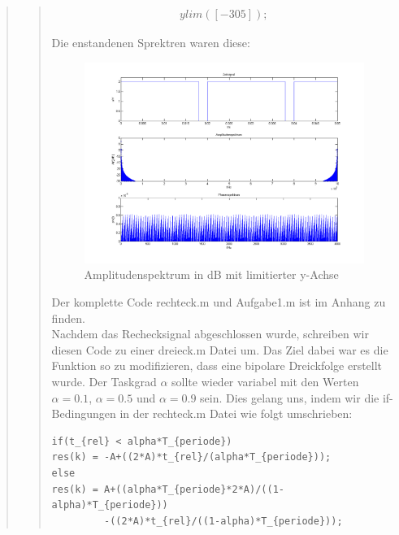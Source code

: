 \begin{quote}
\begin{quote}
\begin{center}
		\begin{align*}
    		ylim ([-30 5]);
		\end{align*}
		
		\end{center}

		Die enstandenen Sprektren waren diese:
		
	           \begin{figure}[H]
    			\centering
    				\includegraphics[scale=0.5]{Ampl[dB].png}
    			\caption{Amplitudenspektrum in dB mit limitierter y-Achse}
    			\end{figure}		
		
		
		\vspace{1em}
		
		Der komplette Code rechteck.m und Aufgabe1.m ist im Anhang zu finden.\\
		
		
		Nachdem das Rechecksignal abgeschlossen wurde, schreiben wir diesen Code zu
		einer dreieck.m Datei um. Das Ziel dabei war es die Funktion so zu
		modifizieren, dass eine bipolare Dreickfolge erstellt wurde. Der Taskgrad
		$\alpha$ sollte wieder variabel mit den Werten $\alpha = 0.1$, $\alpha = 0.5$
		und $\alpha = 0.9$ sein. Dies gelang uns, indem wir die if-Bedingungen in der
		rechteck.m Datei wie folgt umschrieben:

\begin{lstlisting}
if(t_{rel} < alpha*T_{periode})
res(k) = -A+((2*A)*t_{rel}/(alpha*T_{periode}));
else
res(k) = A+((alpha*T_{periode}*2*A)/((1-alpha)*T_{periode}))
         -((2*A)*t_{rel}/((1-alpha)*T_{periode}));
\end{lstlisting}  
		

\end{quote}
\end{quote}
